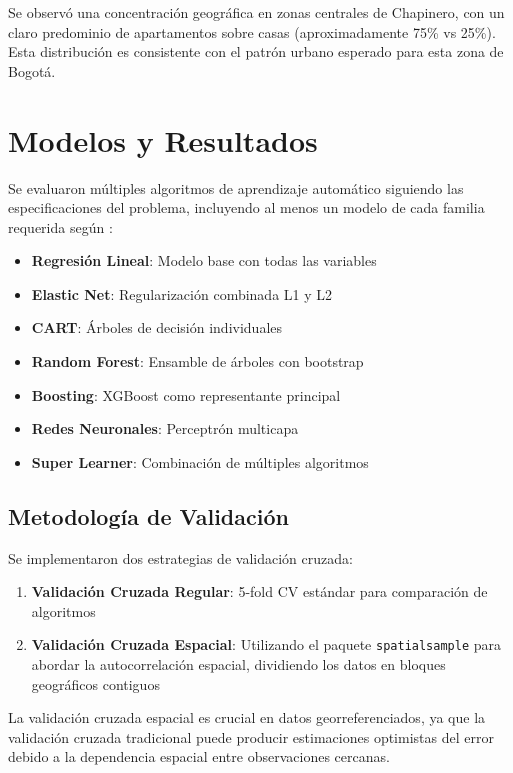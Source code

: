 \documentclass[12pt,a4paper,onecolumn]{article}
\begin{document}
Se observó una concentración geográfica en zonas centrales de Chapinero, con un claro predominio de apartamentos sobre casas (aproximadamente 75\% vs 25\%). Esta distribución es consistente con el patrón urbano esperado para esta zona de Bogotá.

\section{Modelos y Resultados}

Se evaluaron múltiples algoritmos de aprendizaje automático siguiendo las especificaciones del problema, incluyendo al menos un modelo de cada familia requerida según \citet{james2021introduction}:

\begin{itemize}
\item \textbf{Regresión Lineal}: Modelo base con todas las variables
\item \textbf{Elastic Net}: Regularización combinada L1 y L2
\item \textbf{CART}: Árboles de decisión individuales
\item \textbf{Random Forest}: Ensamble de árboles con bootstrap
\item \textbf{Boosting}: XGBoost como representante principal
\item \textbf{Redes Neuronales}: Perceptrón multicapa
\item \textbf{Super Learner}: Combinación de múltiples algoritmos
\end{itemize}

\subsection{Metodología de Validación}

Se implementaron dos estrategias de validación cruzada:

\begin{enumerate}
\item \textbf{Validación Cruzada Regular}: 5-fold CV estándar para comparación de algoritmos
\item \textbf{Validación Cruzada Espacial}: Utilizando el paquete \texttt{spatialsample} para abordar la autocorrelación espacial, dividiendo los datos en bloques geográficos contiguos
\end{enumerate}

La validación cruzada espacial es crucial en datos georreferenciados, ya que la validación cruzada tradicional puede producir estimaciones optimistas del error debido a la dependencia espacial entre observaciones cercanas.
\end{document}
